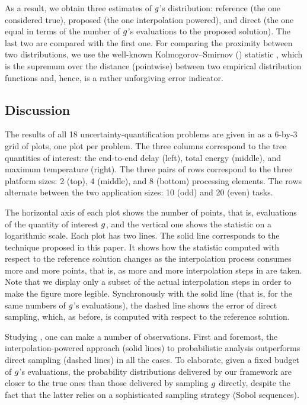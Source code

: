 As a result, we obtain three estimates of $g$'s distribution: reference (the
one considered true), proposed (the one interpolation powered), and direct (the
one equal in terms of the number of $g$'s evaluations to the proposed
solution). The last two are compared with the first one. For comparing the
proximity between two distributions, we use the well-known Kolmogorov--Smirnov
() statistic \cite{rao2009}, which is the supremum over the distance
(pointwise) between two empirical distribution functions and, hence, is a rather
unforgiving error indicator.


\subsection{Discussion}
The results of all 18 uncertainty-quantification problems are given in
 as a 6-by-3 grid of plots, one plot per problem. The three
columns correspond to the tree quantities of interest: the end-to-end delay
(left), total energy (middle), and maximum temperature (right). The three pairs
of rows correspond to the three platform sizes: 2 (top), 4 (middle), and 8
(bottom) processing elements. The rows alternate between the two application
sizes: 10 (odd) and 20 (even) tasks.

The horizontal axis of each plot shows the number of points, that is,
evaluations of the quantity of interest $g$, and the vertical one shows the
 statistic on a logarithmic scale. Each plot has two lines. The solid
line corresponds to the technique proposed in this paper. It shows how the
 statistic computed with respect to the reference solution changes as the
interpolation process consumes more and more points, that is, as more and more
interpolation steps in  are taken. Note that we display only
a subset of the actual interpolation steps in order to make the figure more
legible. Synchronously with the solid line (that is, for the same numbers of
$g$'s evaluations), the dashed line shows the error of direct sampling, which,
as before, is computed with respect to the reference solution.

Studying , one can make a number of observations. First and
foremost, the interpolation-powered approach (solid lines) to probabilistic
analysis outperforms direct sampling (dashed lines) in all the cases. To
elaborate, given a fixed budget of $g$'s evaluations, the probability
distributions delivered by our framework are closer to the true ones than those
delivered by sampling $g$ directly, despite the fact that the latter relies on
a sophisticated sampling strategy (Sobol sequences).

